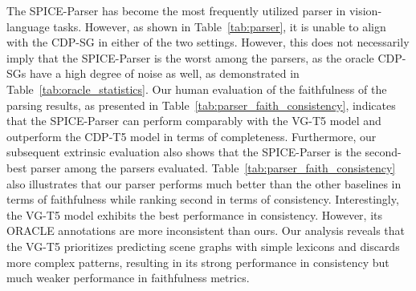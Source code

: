 \begin{table}[t]
\centering
    \caption{Evaluation of faithfulness and consistency across outputs from various scene graph parsers. }
  \label{tab:parser_faith_consistency}
    \vspace{-3mm}
\end{table} The SPICE-Parser has become the most frequently utilized parser in vision-language tasks. However, as shown in Table~\ref{tab:parser}, it is unable to align with the CDP-SG in either of the two settings. However, this does not necessarily imply that the SPICE-Parser is the worst among the parsers, as the oracle CDP-SGs have a high degree of noise as well, as demonstrated in Table~\ref{tab:oracle_statistics}. Our human evaluation of the faithfulness of the parsing results, as presented in Table~\ref{tab:parser_faith_consistency}, indicates that the SPICE-Parser can perform comparably with the VG-T5 model and outperform the CDP-T5 model in terms of completeness. Furthermore, our subsequent extrinsic evaluation also shows that the SPICE-Parser is the second-best parser among the parsers evaluated. Table~\ref{tab:parser_faith_consistency} also illustrates that our parser performs much better than the other baselines in terms of faithfulness while ranking second in terms of consistency. Interestingly, the VG-T5 model exhibits the best performance in consistency. However, its ORACLE annotations are more inconsistent than ours. Our analysis reveals that the VG-T5 prioritizes predicting scene graphs with simple lexicons and discards more complex patterns, resulting in its strong performance in consistency but much weaker performance in faithfulness metrics.

